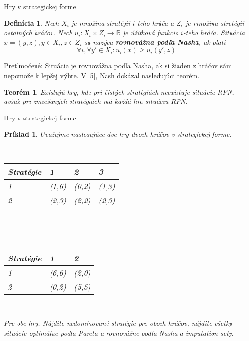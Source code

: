 \documentclass{beamer}
\newtheorem*{thm}{Teor\'em}
\newtheorem*{mydef}{Defin\'icia}
\newtheorem*{exampl}{Pr\'iklad}
\begin{document}
\begin{frame}{Hry v strategickej forme}

\begin{mydef}
Nech $X_{i}$ je mno\v{z}ina strat\'egii $i$-teho hr\'a\v{c}a a $Z_{i}$ je mno\v{z}ina strat\'egii ostatn\'ych hr\'a\v{c}ov. Nech $u_{i}: X_{i} \times Z_{i} \to \mathbb{R}$ je \'u\v{z}itkov\'a funkcia $i$-teho hr\'a\v{c}a. Situ\'acia $x=(y,z), y\in X_{i}, z\in Z_{i}$ sa naz\'yva {\bf rovnov\'a\v{z}na pod\v{l}a Nasha}, ak plat\'i
\[\forall i, \forall y' \in X_{i}: u_{i}(x) \geq u_{i}(y',z)\]
\end{mydef}

Pretlmo\v{c}en\'e: Situ\'acia je rovnov\'a\v{z}na pod\v{l}a Nasha, ak si \v{z}iaden z hr\'a\v{c}ov s\'am nepomo\v{z}e k lep\v{s}ej v\'yhre. V [5], Nash dok\'azal nasleduj\'uci teor\'em.

\begin{thm}
Existuj\'u hry, kde pri \v{c}ist\'ych strat\'egi\'ach neexistuje situ\'acia RPN, av\v{s}ak pri zmie\v{s}an\'ych strat\'egi\'ach m\'a ka\v{z}d\'a hra situ\'aciu RPN.
\end{thm}

\end{frame}


\begin{frame}{Hry v strategickej forme}

\begin{exampl} Uva\v{z}ujme nasleduj\'uce dve hry dvoch hr\'a\v{c}ov v strategickej forme:

\

\begin{tabular}{ l l l l}
Strat\'egie            & 1 & 2 & 3 \\
\hline
 1  & (1,6) & (0,2) & (1,3) \\
 2  & (2,3) & (2,2) & (2,3) \\
\end{tabular}

\

\

\begin{tabular}{l l l}
Strat\'egie            & 1 & 2 \\
\hline
 1  & (6,6) & (2,0) \\
 2  & (0,2) & (5,5) \\
\end{tabular}

\

Pre obe hry. N\'ajdite nedominovan\'e strat\'egie pre oboch hr\'a\v{c}ov, n\'ajdite v\v{s}etky situ\'acie optim\'alne pod\v{l}a Pareta a rovnov\'a\v{z}ne pod\v{l}a Nasha a imputation sety.

\end{exampl}

\end{frame}
\end{document}
